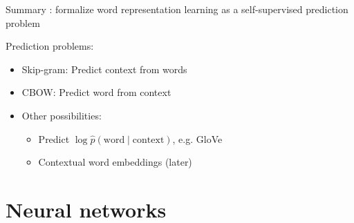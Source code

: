 \documentclass[usenames,dvipsnames,notes,11pt,aspectratio=169]{beamer}
\begin{document}
\begin{frame}
    {Summary}
    : formalize word representation learning as a self-supervised prediction problem

    Prediction problems:\\
    \begin{itemize}
        \item Skip-gram: Predict context from words
        \item CBOW: Predict word from context
        \item Other possibilities:
            \begin{itemize}
                \item Predict $\log \hat{p} (\text{word}\mid \text{context})$, e.g. GloVe
                \item Contextual word embeddings (later)
            \end{itemize}
    \end{itemize}

\end{frame}


\section{Neural networks}
\end{document}
